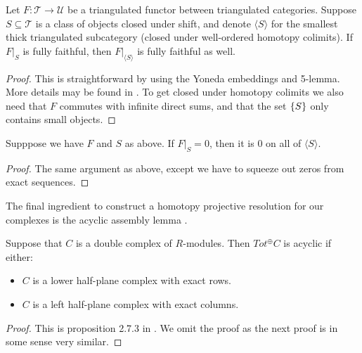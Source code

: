 \documentclass[../thesis.tex]{subfiles}
\begin{document}
            \begin{lemma}[Devissage]
                Let $F: \mathcal{T} \rightarrow \mathcal{U}$ be a triangulated functor between triangulated categories. Suppose $S\subseteq \mathcal{T}$ is a class of objects closed under shift, and denote $\langle S \rangle$ for the smallest thick triangulated subcategory (closed under well-ordered homotopy colimits). If $F|_S$ is fully faithful, then $F|_{\langle S \rangle}$ is fully faithful as well.
            \end{lemma}

            \begin{proof}
                This is straightforward by using the Yoneda embeddings and 5-lemma. More details may be found in \cite{Krause21}. To get closed under homotopy colimits we also need that $F$ commutes with infinite direct sums, and that the set $\{S\}$ only contains small objects.
            \end{proof}

            \begin{lemma}
                Supppose we have $F$ and $S$ as above. If $F|_S = 0$, then it is $0$ on all of $\langle S \rangle$.
            \end{lemma}

            \begin{proof}
                The same argument as above, except we have to squeeze out zeros from exact sequences.
            \end{proof}

            The final ingredient to construct a homotopy projective resolution for our complexes is the acyclic assembly lemma \cite{Weibel94}.

            \begin{lemma}
                Suppose that $C$ is a double complex of $R$-modules. Then $Tot^\oplus C$ is acyclic if either:
                \begin{itemize}
                    \item $C$ is a lower half-plane complex with exact rows.
                    \item $C$ is a left half-plane complex with exact columns.
                \end{itemize}
            \end{lemma}

            \begin{proof}
                This is proposition 2.7.3 in \cite{Weibel94}. We omit the proof as the next proof is in some sense very similar.
            \end{proof}
\end{document}
